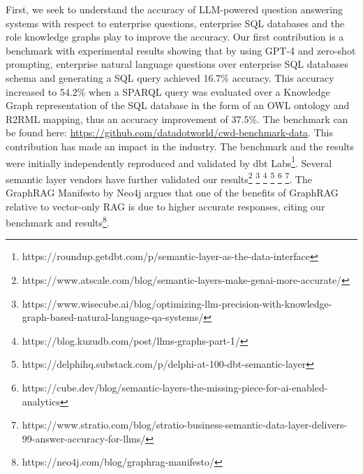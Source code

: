 \documentclass[11pt]{article}
\begin{document}
First, we seek to understand the accuracy of LLM-powered question answering systems with respect to enterprise questions, enterprise SQL databases and the role knowledge graphs play to improve the accuracy. 
Our first contribution \cite{OurPreviousWork,DBLP:conf/grades/SequedaAJ24} is a benchmark with experimental results showing that by using GPT-4 and zero-shot prompting, enterprise natural language questions over enterprise SQL databases schema and generating a SQL query achieved 16.7\% accuracy. 
This accuracy increased to 54.2\% when a SPARQL query was evaluated over a Knowledge Graph representation of the SQL database in the form of an OWL ontology and R2RML mapping, thus an accuracy improvement of 37.5\%.
The benchmark can be found here: \url{https://github.com/datadotworld/cwd-benchmark-data}. 
This contribution has made an impact in the industry. 
The benchmark and the results were initially independently reproduced and validated by dbt Labs\footnote{https://roundup.getdbt.com/p/semantic-layer-as-the-data-interface}.
Several semantic layer vendors have further validated our results\footnote{https://www.atscale.com/blog/semantic-layers-make-genai-more-accurate/}
\footnote{https://www.wisecube.ai/blog/optimizing-llm-precision-with-knowledge-graph-based-natural-language-qa-systems/}
\footnote{https://blog.kuzudb.com/post/llms-graphs-part-1/}
\footnote{https://delphihq.substack.com/p/delphi-at-100-dbt-semantic-layer}
\footnote{https://cube.dev/blog/semantic-layers-the-missing-piece-for-ai-enabled-analytics}
\footnote{https://www.stratio.com/blog/stratio-business-semantic-data-layer-delivers-99-answer-accuracy-for-llms/}.
The GraphRAG Manifesto by Neo4j argues that one of the benefits of GraphRAG relative to vector-only RAG is due to higher accurate responses, citing our benchmark and results\footnote{https://neo4j.com/blog/graphrag-manifesto/}.
\end{document}
